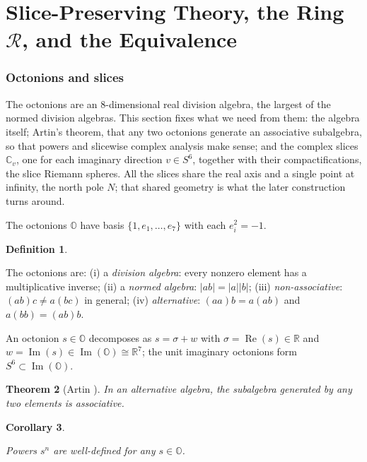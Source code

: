 \documentclass[11pt]{article}
\newcommand{\OO}{\mathbb{O}}
\newcommand{\CC}{\mathbb{C}}
\newcommand{\RR}{\mathbb{R}}
\DeclareMathOperator{\re}{Re}
\DeclareMathOperator{\im}{Im}
\providecommand{\lean}[1]{}
\providecommand{\uses}[1]{}
\theoremstyle{plain}
\newtheorem{theorem}{Theorem}[section]
\newtheorem{corollary}[theorem]{Corollary}
\theoremstyle{definition}
\newtheorem{definition}[theorem]{Definition}
\theoremstyle{remark}
\begin{document}
\part{Slice-Preserving Theory, the Ring $\mathcal R$, and the Equivalence}

\section{Octonions and slices}

The octonions are an $8$-dimensional real division algebra, the largest of the normed division
algebras. This section fixes what we need from them: the algebra itself; Artin's theorem, that any
two octonions generate an associative subalgebra, so that powers and slicewise complex analysis
make sense; and the complex slices $\CC_v$, one for each imaginary direction $v\in S^6$, together
with their compactifications, the slice Riemann spheres. All the slices share the real axis and a
single point at infinity, the north pole $N$; that shared geometry is what the later construction
turns around.

The octonions $\OO$ have basis $\{1,e_1,\dots,e_7\}$ with each $e_i^2=-1$.

\begin{definition}\label{def:octonions}
\lean{Octonion, Octonion.normSq_mul, Octonion.alt_left, Octonion.alt_right}
The octonions are: (i) a \emph{division algebra}: every nonzero element has a
multiplicative inverse; (ii) a \emph{normed algebra}: $|ab|=|a||b|$; (iii)
\emph{non-associative}: $(ab)c\neq a(bc)$ in general; (iv) \emph{alternative}:
$(aa)b=a(ab)$ and $a(bb)=(ab)b$.
\end{definition}

An octonion $s\in\OO$ decomposes as $s=\sigma+w$ with $\sigma=\re(s)\in\RR$ and
$w=\im(s)\in\im(\OO)\cong\RR^7$; the unit imaginary octonions form $S^6\subset\im(\OO)$.

\begin{theorem}[Artin \cite{Schafer66}]\label{thm:artin}
In an alternative algebra, the subalgebra generated by any two elements is
associative.
\end{theorem}

\begin{corollary}\label{cor:powers}
\uses{thm:artin}
Powers $s^n$ are well-defined for any $s\in\OO$.
\end{corollary}
\end{document}
